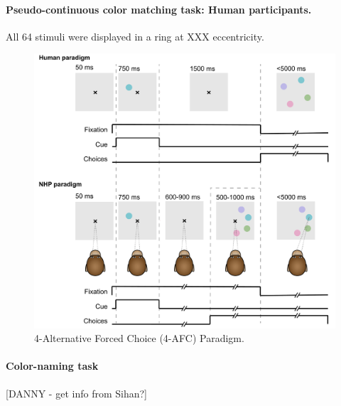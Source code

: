 \paragraph{Pseudo-continuous color matching task: Human participants.} All 64 stimuli were displayed in a ring at XXX eccentricity. 

\begin{figure}
\includegraphics[width=\textwidth]{paradigm.pdf}
\caption{4-Alternative Forced Choice (4-AFC) Paradigm.} 
\end{figure}

\paragraph{Color-naming task} [DANNY - get info from Sihan?]


